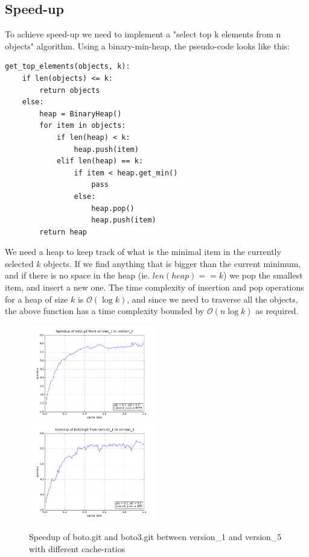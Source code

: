 \documentclass[12pt,twoside,notitlepage]{report}
\begin{document}
\subsection{Speed-up}\label{gettopk}
To achieve speed-up we need to implement a "select top k elements from n objects" algorithm. Using a binary-min-heap, the pseudo-code looks like this:
\begin{lstlisting}
get_top_elements(objects, k):
	if len(objects) <= k:
		return objects
	else:
		heap = BinaryHeap()
		for item in objects:
			if len(heap) < k:
				heap.push(item)
			elif len(heap) == k:
				if item < heap.get_min()
					pass
				else:
					heap.pop()
					heap.push(item)
		return heap
\end{lstlisting}
We need a heap to keep track of what is the minimal item in the currently selected $k$ objects. If we find anything that is bigger than the current minimum, and if there is no space in the heap (ie. $len(heap) == k$) we pop the smallest item, and insert a new one. The time complexity of insertion and pop operations for a heap of size $k$ is $\mathcal{O}(\log{k})$, and since we need to traverse all the objects, the above function has a time complexity bounded by $\mathcal{O}(n\log{k})$ as required.
\begin{figure}[h]
\includegraphics[width=0.5\textwidth]{figure_1.png}
\includegraphics[width=0.5\textwidth]{figure_2.png}

\caption{Speedup of boto.git and boto3.git between version\_1 and version\_5 with different cache-ratios}
\label{fig:speedup}
\end{figure}
\end{document}
